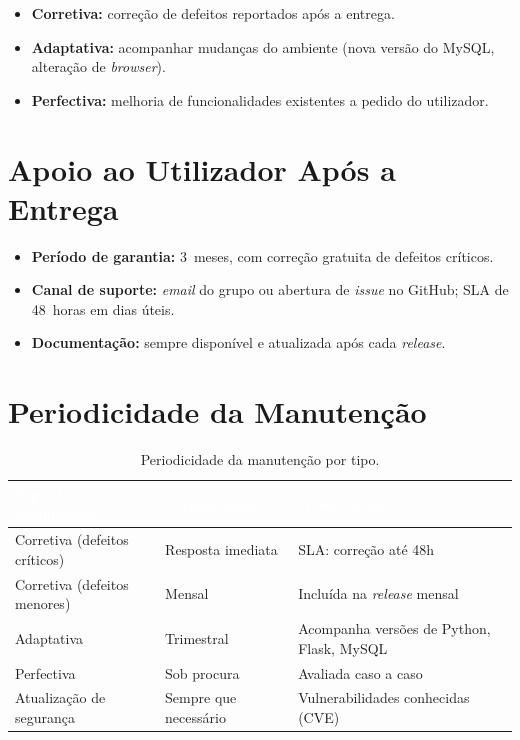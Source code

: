 \documentclass[11pt,a4paper]{report}
\begin{document}
\begin{itemize}
  \item \textbf{Corretiva:} correção de defeitos reportados após a entrega.
  \item \textbf{Adaptativa:} acompanhar mudanças do ambiente (nova versão do MySQL, alteração de \textit{browser}).
  \item \textbf{Perfectiva:} melhoria de funcionalidades existentes a pedido do utilizador.
\end{itemize}

\section{Apoio ao Utilizador Após a Entrega}
\begin{itemize}
  \item \textbf{Período de garantia:} 3~meses, com correção gratuita de defeitos críticos.
  \item \textbf{Canal de suporte:} \textit{email} do grupo ou abertura de \textit{issue} no GitHub; SLA de 48~horas em dias úteis.
  \item \textbf{Documentação:} sempre disponível e atualizada após cada \textit{release}.
\end{itemize}

\section{Periodicidade da Manutenção}

\begin{table}[H]
\centering\small
\begin{tabularx}{\textwidth}{L{5cm} L{3cm} X}
\toprule
{}
\textbf{\textcolor{white}{Tipo de Manutenção}} &
\textbf{\textcolor{white}{Periodicidade}} &
\textbf{\textcolor{white}{Observações}} \\
\midrule
Corretiva (defeitos críticos) & Resposta imediata & SLA: correção até 48h \\
Corretiva (defeitos menores) & Mensal & Incluída na \textit{release} mensal \\
Adaptativa & Trimestral & Acompanha versões de Python, Flask, MySQL \\
Perfectiva & Sob procura & Avaliada caso a caso \\
Atualização de segurança & Sempre que necessário & Vulnerabilidades conhecidas (CVE) \\
\bottomrule
\end{tabularx}
\caption{Periodicidade da manutenção por tipo.}
\label{tab:manutencao}
\end{table}
\end{document}
